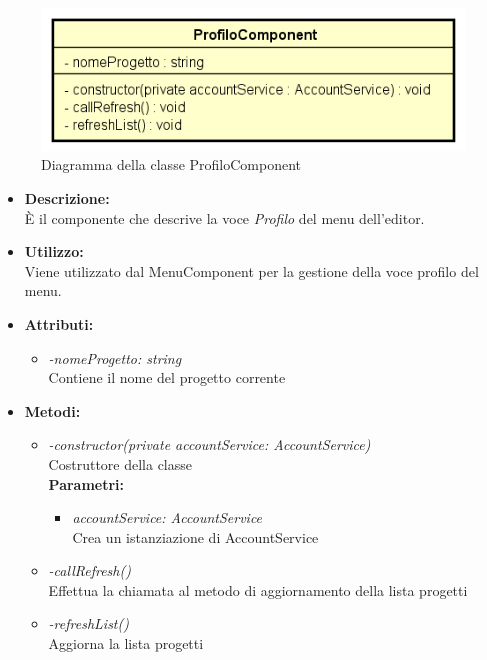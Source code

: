 \begin{figure}[h!]
	\centering
	\includegraphics[scale=0.8]{res/sections/SpecificaFrontEnd/Components/Disegnetti/profilo.png}
	\caption{Diagramma della classe ProfiloComponent}
\end{figure}

\begin{itemize}
	\item \textbf{Descrizione:}\\
	È il componente che descrive la voce \textit{Profilo} del menu dell'editor.
	\item \textbf{Utilizzo:}\\
	Viene utilizzato dal MenuComponent per la gestione della voce profilo del menu.
	\item \textbf{Attributi:}
		\begin{itemize}
			\item \emph{-nomeProgetto: string}\\
			Contiene il nome del progetto corrente
		\end{itemize}
	\item \textbf{Metodi:}
		\begin{itemize}
			\item \emph{-constructor(private accountService: AccountService)}\\
    		Costruttore della classe\\
    		\textbf{Parametri:}
    		\begin{itemize}
    			\item \emph{accountService: AccountService}\\
    			Crea un istanziazione di AccountService
    		\end{itemize}
    		\item \emph{-callRefresh()}\\
    		Effettua la chiamata al metodo di aggiornamento della lista progetti\\
    		\item \emph{-refreshList()}\\
    		Aggiorna la lista progetti
		\end{itemize}
\end{itemize}